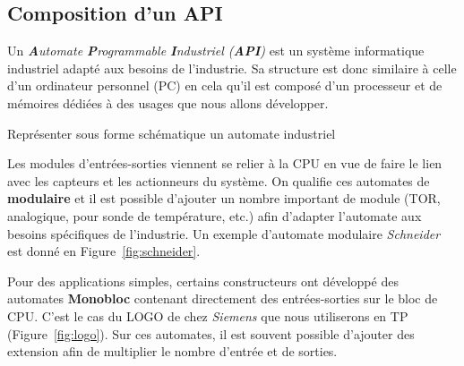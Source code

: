 \subsection{Composition d'un API}
Un \textit{\textbf{A}utomate \textbf{P}rogrammable \textbf{I}ndustriel (\textbf{API})} est un système informatique industriel adapté aux besoins de l'industrie. Sa structure est donc similaire à celle d'un ordinateur personnel (PC) en cela qu'il est composé d'un processeur et de mémoires dédiées à des usages que nous allons développer. 

\begin{UPSTIactivite}
    Représenter sous forme schématique un automate industriel
    \begin{center}
    \end{center}   

\end{UPSTIactivite}

Les modules d'entrées-sorties viennent se relier à la CPU en vue de faire le lien avec les capteurs et les actionneurs du système. On qualifie ces automates de \textbf{modulaire} et il est possible d'ajouter un nombre important de module (TOR, analogique, pour sonde de température, etc.) afin d'adapter l'automate aux besoins spécifiques de l'industrie. Un exemple d'automate modulaire \textit{Schneider} est donné en Figure~\ref{fig:schneider}. 

Pour des applications simples, certains constructeurs ont développé des automates \textbf{Monobloc} contenant directement des entrées-sorties sur le bloc de CPU. C'est le cas du LOGO de chez \textit{Siemens} que nous utiliserons en TP (Figure~\ref{fig:logo}). Sur ces automates, il est souvent possible d'ajouter des extension afin de multiplier le nombre d'entrée et de sorties. 

